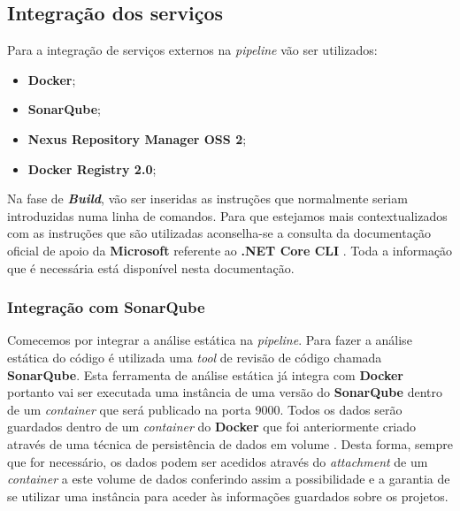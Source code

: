 \subsection{Integração dos serviços}

\hspace{1cm}Para a integração de serviços externos na \textit{pipeline} vão ser utilizados:

\begin{itemize}
 \item \textbf{Docker};
 \item \textbf{SonarQube};
 \item \textbf{Nexus Repository Manager OSS 2};
 \item \textbf{Docker Registry 2.0};
\end{itemize}

\hspace{1cm}Na fase de \textit{\textbf{Build}}, vão ser inseridas as instruções que normalmente seriam introduzidas numa linha de comandos. Para que estejamos mais contextualizados com as instruções que são utilizadas aconselha-se a consulta da documentação oficial de apoio da \textbf{Microsoft} referente ao \textbf{.NET Core CLI} \cite{dotnetcorecli}. Toda a informação que é necessária está disponível nesta documentação.

\subsubsection{Integração com \textbf{SonarQube}}

\hspace{1cm}Comecemos por integrar a análise estática na \textit{pipeline}. Para fazer a análise estática do código é utilizada uma \textit{tool} de revisão de código chamada \textbf{SonarQube}. Esta ferramenta de análise estática já integra com \textbf{Docker} portanto vai ser executada uma instância de uma versão do \textbf{SonarQube} dentro de um \textit{container} que será publicado na porta 9000. Todos os dados serão guardados dentro de um \textit{container} do \textbf{Docker} que foi anteriormente criado através de uma técnica de persistência de dados em volume \cite{dockervolumes}. Desta forma, sempre que for necessário, os dados podem ser acedidos através do \textit{attachment} de um \textit{container} a este volume de dados conferindo assim a possibilidade e a garantia de se utilizar uma instância para aceder às informações guardados sobre os projetos. 

